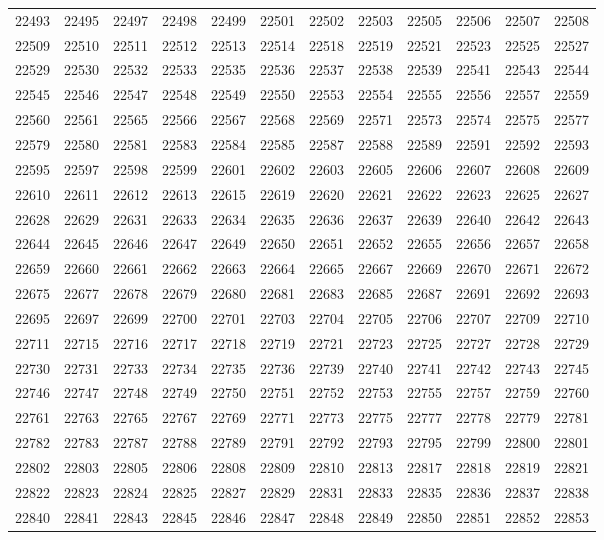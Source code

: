 \begin{center}
\begin{longtable}{llllllllllll}
22493 &22495 &22497 &22498 &22499 &22501 &22502 &22503 &22505 &22506 &22507 &22508 \\
22509 &22510 &22511 &22512 &22513 &22514 &22518 &22519 &22521 &22523 &22525 &22527 \\
22529 &22530 &22532 &22533 &22535 &22536 &22537 &22538 &22539 &22541 &22543 &22544 \\
22545 &22546 &22547 &22548 &22549 &22550 &22553 &22554 &22555 &22556 &22557 &22559 \\
22560 &22561 &22565 &22566 &22567 &22568 &22569 &22571 &22573 &22574 &22575 &22577 \\
22579 &22580 &22581 &22583 &22584 &22585 &22587 &22588 &22589 &22591 &22592 &22593 \\
22595 &22597 &22598 &22599 &22601 &22602 &22603 &22605 &22606 &22607 &22608 &22609 \\
22610 &22611 &22612 &22613 &22615 &22619 &22620 &22621 &22622 &22623 &22625 &22627 \\
22628 &22629 &22631 &22633 &22634 &22635 &22636 &22637 &22639 &22640 &22642 &22643 \\
22644 &22645 &22646 &22647 &22649 &22650 &22651 &22652 &22655 &22656 &22657 &22658 \\
22659 &22660 &22661 &22662 &22663 &22664 &22665 &22667 &22669 &22670 &22671 &22672 \\
22675 &22677 &22678 &22679 &22680 &22681 &22683 &22685 &22687 &22691 &22692 &22693 \\
22695 &22697 &22699 &22700 &22701 &22703 &22704 &22705 &22706 &22707 &22709 &22710 \\
22711 &22715 &22716 &22717 &22718 &22719 &22721 &22723 &22725 &22727 &22728 &22729 \\
22730 &22731 &22733 &22734 &22735 &22736 &22739 &22740 &22741 &22742 &22743 &22745 \\
22746 &22747 &22748 &22749 &22750 &22751 &22752 &22753 &22755 &22757 &22759 &22760 \\
22761 &22763 &22765 &22767 &22769 &22771 &22773 &22775 &22777 &22778 &22779 &22781 \\
22782 &22783 &22787 &22788 &22789 &22791 &22792 &22793 &22795 &22799 &22800 &22801 \\
22802 &22803 &22805 &22806 &22808 &22809 &22810 &22813 &22817 &22818 &22819 &22821 \\
22822 &22823 &22824 &22825 &22827 &22829 &22831 &22833 &22835 &22836 &22837 &22838 \\
22840 &22841 &22843 &22845 &22846 &22847 &22848 &22849 &22850 &22851 &22852 &22853 \\

\end{longtable}
\end{center}
